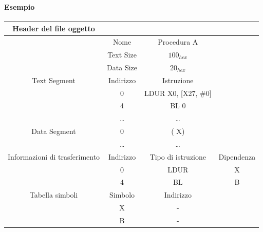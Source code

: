 \documentclass[12pt,a4paper]{article}
\begin{document}
\paragraph{Esempio}
\Sep
\begin{center}
\begin{tabular}{|c|c|c|c|}
\hline
\textbf{Header del file oggetto} &                          &                                                &                          \\ \hline
                                 & Nome                     & Procedura A                                    &                          \\ \hline
                                 & Text Size                & $100_{hex}$                                    &                          \\ \hline
                                 & Data Size                & $20_{hex}$                                     &                          \\ \hline
Text Segment                     & Indirizzo                & Istruzione                                     &                          \\ \hline
                                 & 0                        &  LDUR X0, {[}X27, {\color[HTML]{3531FF}\#0{}}] &                          \\ \hline
                                 & 4                        & BL {\color[HTML]{3531FF} 0}                    &                          \\ \hline
                                 & \dots     & \dots                           &                          \\ \hline
Data Segment                     & {\color[HTML]{3531FF} 0} & ({\color[HTML]{3531FF} X})                     &                          \\ \hline
                                 & \dots     & \dots                           &                          \\ \hline
Informazioni di trasferimento    & Indirizzo                & Tipo di istruzione                             & Dipendenza               \\ \hline
                                 & 0                        & LDUR                                           & {\color[HTML]{3531FF} X} \\ \hline
                                 & 4                        & BL                                             & {\color[HTML]{3531FF} B} \\ \hline
Tabella simboli                  & Simbolo                  & Indirizzo                                      &                          \\ \hline
                                 & {\color[HTML]{3531FF} X} & -                                              &                          \\ \hline
                                 & {\color[HTML]{3531FF} B} & -                                              &                          \\ \hline
\end{tabular}
\end{center}
\end{document}
